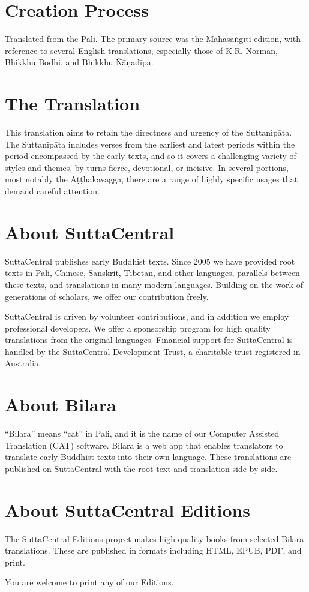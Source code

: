 \documentclass[12pt,openany]{book}%
\begin{document}
\section*{Creation Process}

Translated from the Pali. The primary source was the \textsanskrit{Mahāsaṅgīti} edition, with reference to several English translations, especially those of K.R. Norman, Bhikkhu Bodhi, and Bhikkhu \textsanskrit{Ñāṇadīpa}.

\section*{The Translation}

This translation aims to retain the directness and urgency of the \textsanskrit{Suttanipāta}. The \textsanskrit{Suttanipāta} includes verses from the earliest and latest periods within the period encompassed by the early texts, and so it covers a challenging variety of styles and themes, by turns fierce, devotional, or incisive. In several portions, most notably the \textsanskrit{Aṭṭhakavagga}, there are a range of highly specific usages that demand careful attention.

\section*{About SuttaCentral}

SuttaCentral publishes early Buddhist texts. Since 2005 we have provided root texts in Pali, Chinese, Sanskrit, Tibetan, and other languages, parallels between these texts, and translations in many modern languages. Building on the work of generations of scholars, we offer our contribution freely.

SuttaCentral is driven by volunteer contributions, and in addition we employ professional developers. We offer a sponsorship program for high quality translations from the original languages. Financial support for SuttaCentral is handled by the SuttaCentral Development Trust, a charitable trust registered in Australia.

\section*{About Bilara}

“Bilara” means “cat” in Pali, and it is the name of our Computer Assisted Translation (CAT) software. Bilara is a web app that enables translators to translate early Buddhist texts into their own language. These translations are published on SuttaCentral with the root text and translation side by side.

\section*{About SuttaCentral Editions}

The SuttaCentral Editions project makes high quality books from selected Bilara translations. These are published in formats including HTML, EPUB, PDF, and print.

You are welcome to print any of our Editions.

%
\end{document}
